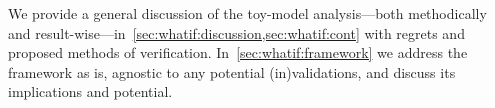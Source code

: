 





\newcommand\Ft{\ALIASFt}
\newcommand\ah{\ALIASah}
\newcommand\lcoord{\ALIASlcoord}
\newcommand\lcoordx{\ALIASlcoordx}
\newcommand\lcoordk{\ALIASlcoordk}
\newcommand\hpA{\ALIAShpA}
\newcommand\hpB{\ALIAShpB}
\newcommand\hpC{\ALIAShpC}
\newcommand\hpAB{\ALIAShpAB}
\newcommand\hpCR{\ALIAShpCR}
\newcommand\hpCI{\ALIAShpCI}
\newcommand\epsA{\ALIASepsA}
\newcommand\epsB{\ALIASepsB}
\newcommand\epsC{\ALIASepsC}
\newcommand\wallsep{\ALIASwallsep}









We provide a general discussion of the toy-model analysis---both methodically and result-wise---in~\cref{sec:whatif:discussion,sec:whatif:cont} with regrets and proposed methods of verification. In~\cref{sec:whatif:framework} we address the framework as is, agnostic to any potential (in)validations, and discuss its implications and potential.
















